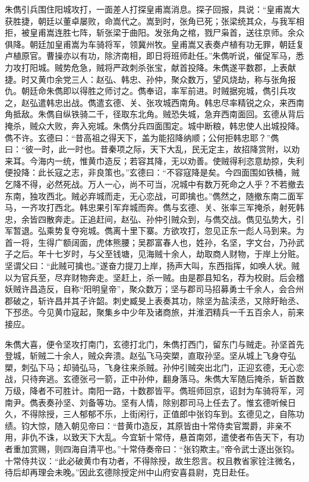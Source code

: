 \documentclass[a4paper]{article}
\begin{document}
朱儁引兵围住阳城攻打，一面差人打探皇甫嵩消息。探子回报，具说：“皇甫嵩大获胜捷，朝廷以董卓屡败，命嵩代之。嵩到时，张角已死；张梁统其众，与我军相拒，被皇甫嵩连胜七阵，斩张梁于曲阳。发张角之棺，戮尸枭首，送往京师。余众俱降。朝廷加皇甫嵩为车骑将军，领冀州牧。皇甫嵩又表奏卢植有功无罪，朝廷复卢植原官。曹操亦以有功，除济南相，即日将班师赴任。”朱儁听说，催促军马，悉力攻打阳城。贼势危急，贼将严政刺杀张宝，献首投降。朱儁遂平数郡，上表献捷。时又黄巾余党三人：赵弘、韩忠、孙仲，聚众数万，望风烧劫，称与张角报仇。朝廷命朱儁即以得胜之师讨之。儁奉诏，率军前进。时贼据宛城，儁引兵攻之，赵弘遣韩忠出战。儁遣玄德、关、张攻城西南角。韩忠尽率精锐之众，来西南角抵敌。朱儁自纵铁骑二千，径取东北角。贼恐失城，急弃西南面回。玄德从背后掩杀，贼众大败，奔入宛城。朱儁分兵四面围定。城中断粮，韩忠使人出城投降。儁不许。玄德曰：“昔高祖之得天下，盖为能招降纳顺；公何拒韩忠耶？”儁曰：“彼一时，此一时也。昔秦项之际，天下大乱，民无定主，故招降赏附，以劝来耳。今海内一统，惟黄巾造反；若容其降，无以劝善。使贼得利恣意劫掠，失利便投降：此长寇之志，非良策也。”玄德曰：“不容寇降是矣。今四面围如铁桶，贼乞降不得，必然死战。万人一心，尚不可当，况城中有数万死命之人乎？不若撤去东南，独攻西北。贼必弃城而走，无心恋战，可即擒也。”儁然之，随撤东南二面军马，一齐攻打西北。韩忠果引军弃城而奔。儁与玄德、关、张率三军掩杀，射死韩忠，余皆四散奔走。正追赶间，赵弘、孙仲引贼众到，与儁交战。儁见弘势大，引军暂退。弘乘势复夺宛城。儁离十里下寨。方欲攻打，忽见正东一彪人马到来。为首一将，生得广额阔面，虎体熊腰；吴郡富春人也，姓孙，名坚，字文台，乃孙武子之后。年十七岁时，与父至钱塘，见海贼十余人，劫取商人财物，于岸上分赃。坚谓父曰：“此贼可擒也。”遂奋力提刀上岸，扬声大叫，东西指挥，如唤人状。贼以为官兵至，尽弃财物奔走。坚赶上，杀一贼。由是郡县知名，荐为校尉。后会稽妖贼许昌造反，自称“阳明皇帝”，聚众数万；坚与郡司马招募勇士千余人，会合州郡破之，斩许昌并其子许韶。刺史臧旻上表奏其功，除坚为盐渎丞，又除盱眙丞、下邳丞。今见黄巾寇起，聚集乡中少年及诸商旅，并淮泗精兵一千五百余人，前来接应。

朱儁大喜，便令坚攻打南门，玄德打北门，朱儁打西门，留东门与贼走。孙坚首先登城，斩贼二十余人，贼众奔溃。赵弘飞马突槊，直取孙坚。坚从城上飞身夺弘槊，刺弘下马；却骑弘马，飞身往来杀贼。孙仲引贼突出北门，正迎玄德，无心恋战，只待奔逃。玄德张弓一箭，正中孙仲，翻身落马。朱儁大军随后掩杀，斩首数万级，降者不可胜计。南阳一路，十数郡皆平。儁班师回京，诏封为车骑将军，河南尹。儁表奏孙坚、刘备等功。坚有人情，除别郡司马上任去了。惟玄德听候日久，不得除授，三人郁郁不乐，上街闲行，正值郎中张钧车到。玄德见之，自陈功绩。钧大惊，随入朝见帝曰：“昔黄巾造反，其原皆由十常侍卖官鬻爵，非亲不用，非仇不诛，以致天下大乱。今宜斩十常侍，悬首南郊，遣使者布告天下，有功者重加赏赐，则四海自清平也。”十常侍奏帝曰：“张钧欺主。”帝令武士逐出张钧。十常侍共议：“此必破黄巾有功者，不得除授，故生怨言。权且教省家铨注微名，待后却再理会未晚。”因此玄德除授定州中山府安喜县尉，克日赴任。
\end{document}
